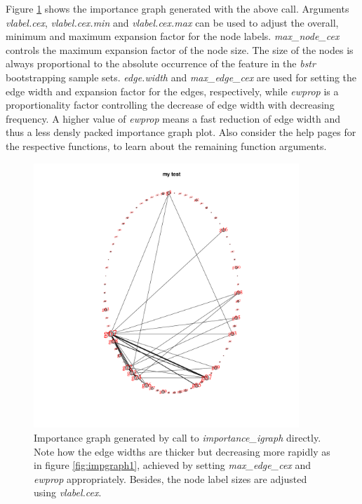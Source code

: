 \documentclass[11pt,a4paper]{article}
\begin{document}
Figure \ref{fig:impgraph2} shows the importance graph generated with the above call. Arguments \emph{vlabel.cex}, \emph{vlabel.cex.min} and \emph{vlabel.cex.max} can be used to adjust the overall, minimum and maximum expansion factor for the node labels. \emph{max\_node\_cex} controls the maximum expansion factor of the node size. The size of the nodes is always proportional to the absolute occurrence of the feature in the \emph{bstr} bootstrapping sample sets. \emph{edge.width} and \emph{max\_edge\_cex} are used for setting the edge width and expansion factor for the edges, respectively, while \emph{ewprop} is a proportionality factor controlling the decrease of edge width with decreasing frequency. A higher value of \emph{ewprop} means a fast reduction of edge width and thus a less densly packed importance graph plot. Also consider the help pages for the respective functions, to learn about the remaining function arguments.

\begin{figure}[htp]
\centering
\includegraphics[width=10cm,height=10cm]{impgraph2}
\caption{Importance graph generated by call to \emph{importance\_igraph} directly. Note how the edge widths are thicker but decreasing more rapidly as in figure \ref{fig:impgraph1}, achieved by setting \emph{max\_edge\_cex} and \emph{ewprop} appropriately. Besides, the node label sizes are adjusted using \emph{vlabel.cex}.}
\label{fig:impgraph2}
\end{figure}
\end{document}
